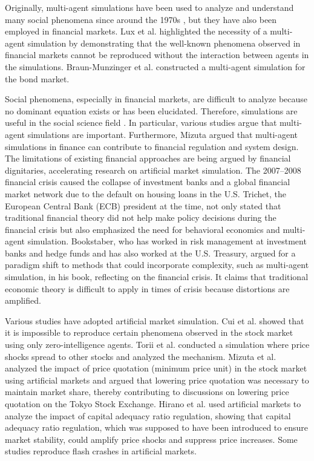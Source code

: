 Originally, multi-agent simulations have been used to analyze and understand many social phenomena since around the 1970s \cite{schelling1969,schelling1969}, but they have also been employed in financial markets.
Lux et al.\cite{Lux1999} highlighted the necessity of a multi-agent simulation by demonstrating that the well-known phenomena observed in financial markets cannot be reproduced without the interaction between agents in the simulations.
Braun-Munzinger et al.\cite{Braun-Munzinger2016} constructed a multi-agent simulation for the bond market.

Social phenomena, especially in financial markets, are difficult to analyze because no dominant equation exists or has been elucidated.
Therefore, simulations are useful in the social science field \cite{Edmonds2005}.
In particular, various studies argue that multi-agent simulations are important\cite{Farmer2009,Battiston2016}.
Furthermore, Mizuta\cite{Mizuta2019} argued that multi-agent simulations in finance can contribute to financial regulation and system design.
The limitations of existing financial approaches are being argued by financial dignitaries, accelerating research on artificial market simulation.
The 2007--2008 financial crisis caused the collapse of investment banks and a global financial market network due to the default on housing loans in the U.S.
Trichet, the European Central Bank (ECB) president at the time, not only stated that traditional financial theory did not help make policy decisions during the financial crisis but also emphasized the need for behavioral economics and multi-agent simulation\cite{Trichet2011}.
Bookstaber, who has worked in risk management at investment banks and hedge funds and has also worked at the U.S. Treasury, argued for a paradigm shift to methods that could incorporate complexity, such as multi-agent simulation, in his book\cite{Bookstaber2017}, reflecting on the financial crisis.
It claims that traditional economic theory is difficult to apply in times of crisis because distortions are amplified.

Various studies have adopted artificial market simulation.
Cui et al.\cite{Cui2012} showed that it is impossible to reproduce certain phenomena observed in the stock market using only zero-intelligence agents.
Torii et al.\cite{Torii2015} conducted a simulation where price shocks spread to other stocks and analyzed the mechanism.
Mizuta et al.\cite{Mizuta2016} analyzed the impact of price quotation (minimum price unit) in the stock market using artificial markets and argued that lowering price quotation was necessary to maintain market share, thereby contributing to discussions on lowering price quotation on the Tokyo Stock Exchange.
Hirano et al.\cite{Hirano2020c} used artificial markets to analyze the impact of capital adequacy ratio regulation, showing that capital adequacy ratio regulation, which was supposed to have been introduced to ensure market stability, could amplify price shocks and suppress price increases.
Some studies reproduce flash crashes in artificial markets\cite{Leal2019,Paddrik2012}.


